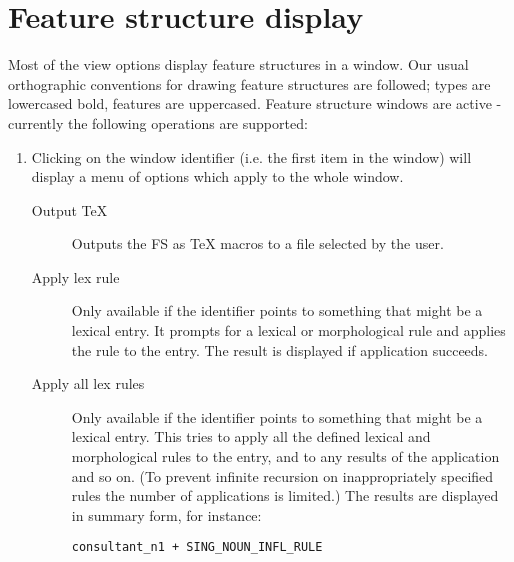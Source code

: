 \documentclass[12pt]{report}
\begin{document}
\section{Feature structure display}
\label{activefs}

Most of the view options display feature structures in a window.  
Our usual orthographic conventions for
drawing feature structures are followed; types are lowercased bold,
features are uppercased.  Feature structure windows
are active - currently the following operations are supported:
\begin{enumerate}
\item Clicking on the window identifier (i.e. the first item in the
window) will display a menu of options which apply to the whole
window.
\begin{description}
\item [Output TeX] Outputs the FS as TeX macros to a file selected by
the user.  
\item[Apply lex rule]
Only available if the identifier points to something that might
be a lexical entry.
It prompts for a lexical or morphological rule
and applies the rule to the entry.  The result is displayed if
application succeeds.  
\item[Apply all lex rules]
Only available if the identifier points to something that might
be a lexical entry.
This tries to apply all the defined
lexical and morphological rules to the entry, and to any results of
the application and so on.  (To prevent infinite recursion on
inappropriately specified rules the number of applications is limited.)
The results are displayed in summary form,
for instance:
\begin{verbatim}
consultant_n1 + SING_NOUN_INFL_RULE


\end{verbatim}
\end{description}
\end{enumerate}
\end{document}
